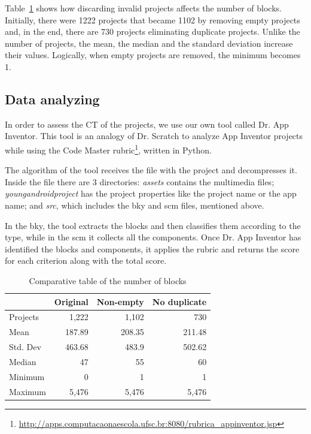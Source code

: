 \documentclass[a4paper]{article}
\begin{document}
Table~\ref{tab:blocks} shows how discarding invalid projects affects the number of blocks. Initially, there were 1222 projects that became 1102 by removing empty projects and, in the end, there are 730 projects eliminating duplicate projects. Unlike the number of projects, the mean, the median and the standard deviation increase their values. Logically, when empty projects are removed, the minimum becomes 1.

\subsection{Data analyzing}
In order to assess the CT of the projects, we use our own tool called Dr. App Inventor. This tool is an analogy of Dr. Scratch to analyze App Inventor projects while using the Code Master rubric\footnote{\url{http://apps.computacaonaescola.ufsc.br:8080/rubrica_appinventor.jsp}}, written in Python.

The algorithm of the tool receives the file with the project and decompresses it. Inside the file there are 3 directories: \emph{assets} contains the multimedia files; \emph{youngandroidproject} has the project properties like the project name or the app name; and \emph{src}, which includes the bky and scm files, mentioned above.

In the bky, the tool extracts the blocks and then classifies them according to the type, while in the scm it collects all the components. Once Dr. App Inventor has identified the blocks and components, it applies the rubric and returns the score for each criterion along with the total score.

\begin{table}
\begin{center}
\caption{Comparative table of the number of blocks}
\bigskip
\label{tab:blocks}
\begin{tabular}{|l|r|r|r|}
\hline
& Original & Non-empty & No duplicate \\ \hline
Projects & 1,222 & 1,102 & 730\\ \hline
Mean & 187.89 & 208.35 & 211.48\\ \hline
Std. Dev & 463.68 & 483.9 & 502.62 \\ \hline
Median & 47 & 55 & 60\\ \hline
Minimum & 0 & 1 & 1\\ \hline
Maximum & 5,476 & 5,476 & 5,476 \\ \hline
\end{tabular}
\end{center}
\end{table}
\end{document}
